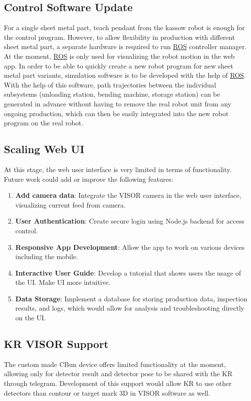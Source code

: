 \subsection{Control Software Update}
\label{subsec:control-software-update}
For a single sheet metal part, teach pendant from the kassow robot is enough for the control program.
However, to allow flexibility in production with different sheet metal part, a separate hardware is required
to run \hyperref[acro:ROS]{ROS} controller manager.
At the moment, \hyperref[acro:ROS]{ROS} is only used for visualizing the robot motion in the web app.
In order to be able to quickly create a new robot program for new sheet metal part variants, simulation
software is to be developed with the help of \hyperref[acro:ROS]{ROS}. With the help of this software, path trajectories between
the individual subsystems (unloading station, bending machine, storage station) can be generated in
advance without having to remove the real robot unit from any ongoing production, which can
then be easily integrated into the new robot program on the real robot.

\subsection{Scaling Web UI}
\label{subsec:web-ui-update}
At this stage, the web user interface is very limited in terms of functionality. Future work could add or improve the following features:
\begin{enumerate}
    \item \textbf{Add camera data}: Integrate the VISOR camera in the web user interface, visualizing current feed from camera.
    \item \textbf{User Authentication}: Create secure login using Node.js backend for access control.
    \item \textbf{Responsive App Development}: Allow the app to work on various devices including the mobile.
    \item \textbf{Interactive User Guide}: Develop a tutorial that shows users the usage of the UI. Make UI more intuitive.
    \item \textbf{Data Storage}: Implement a database for storing production data, inspection results, and logs, which would allow for analysis and troubleshooting directly on the UI.
\end{enumerate}

\subsection{KR VISOR Support}
The custom made CBun device offers limited functionality at the moment, allowing only for detector result and detector pose to be shared with the KR through telegram. Development of this support would allow KR to use other detectors than contour or target mark 3D in VISOR software as well.

